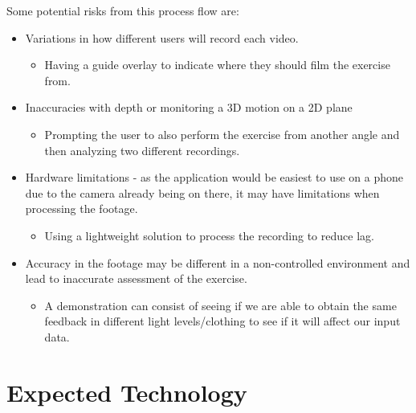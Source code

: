 \documentclass{article}
\begin{document}
Some potential risks from this process flow are:
\begin{itemize}
  \item Variations in how different users will record each video.
  \begin{itemize}
    \item Having a guide overlay to indicate where they should film the exercise from.
  \end{itemize}  
  \item Inaccuracies with depth or monitoring a 3D motion on a 2D plane
  \begin{itemize}
    \item Prompting the user to also perform the exercise from another angle and then analyzing two different recordings.
  \end{itemize}
  \item Hardware limitations - as the application would be easiest to use on a phone due to the camera already being on there, it may have limitations when processing the footage.
  \begin{itemize}
    \item Using a lightweight solution to process the recording to reduce lag.
  \end{itemize}
  \item Accuracy in the footage may be different in a non-controlled environment and lead to inaccurate assessment of the exercise. 
  \begin{itemize}
    \item A demonstration can consist of seeing if we are able to obtain the same feedback in different light levels/clothing to see if it will affect our input data.
  \end{itemize} 
\end{itemize}

\section{Expected Technology}


\end{document}
